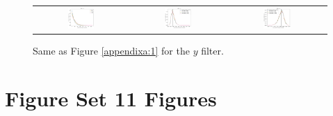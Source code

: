 \documentclass[preprintm,linenumbers]{aastex631}
\begin{document}
     \begin{figure}[h]
			\centering
			\begin{tabular}{c c c}
				
				\includegraphics[width=0.3\textwidth]{results/histograms_templates_tscale/hist_first_year_one_snap_v4_0_10yrs_db_noDD_noTwi_doALLTemplateMetrics_reduceNTemplate_y_noDD_noTwi.pdf} &
				\includegraphics[width=0.3\textwidth]{results/histograms_templates_tscale/hist_first_year_one_snap_v4_0_10yrs_db_noDD_noTwi_doALLTemplateMetrics_reduceSeeingTemplate_y_noDD_noTwi.pdf} &
				\includegraphics[width=0.3\textwidth]{results/histograms_templates_tscale/hist_first_year_one_snap_v4_0_10yrs_db_noDD_noTwi_doALLTemplateMetrics_reduceDepthTemplate_y_noDD_noTwi.pdf} \\
				
			\end{tabular}
			\caption{
				Same as Figure \ref{appendixa:1} for the $y$ filter.  
           \label{appendixa:6}
			}
		\end{figure}
		



		\section{Figure Set 11 Figures}
		
\end{document}
